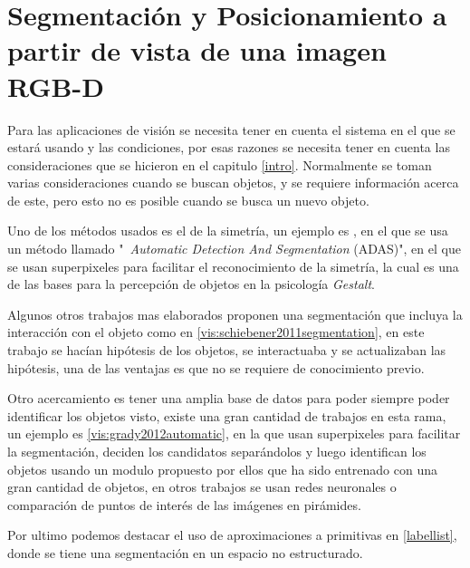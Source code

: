     \chapter{Segmentación y Posicionamiento a partir de vista de una imagen RGB-D}
    
    Para las aplicaciones de visión se necesita tener en cuenta el sistema en el que se estará usando y las condiciones, por esas razones se necesita tener en cuenta las consideraciones que se hicieron en el capitulo \ref{intro}. Normalmente se toman varias consideraciones cuando se buscan objetos, y se requiere información acerca de este, pero esto no es posible cuando se busca un nuevo objeto.
    
    Uno de los métodos usados es el de la simetría, un ejemplo es \cite{vis:kootstra2010fast}, en el que se usa un método llamado "\ \textit{Automatic Detection And Segmentation }(ADAS)", en el que se usan superpixeles para facilitar el reconocimiento de la simetría, la cual es una de las bases para la percepción de objetos en la psicología \textit{Gestalt}.
    
    Algunos otros trabajos mas elaborados proponen una segmentación que incluya la interacción con el objeto como en \cref{vis:schiebener2011segmentation}, en este trabajo se hacían hipótesis de los objetos, se interactuaba y se actualizaban las hipótesis, una de las ventajas es que no se requiere de conocimiento previo.
    
    Otro acercamiento es tener una amplia base de datos para poder siempre poder identificar los objetos visto, existe una gran cantidad de trabajos en esta rama, un ejemplo es \cref{vis:grady2012automatic}, en la que usan superpixeles para facilitar la segmentación, deciden los candidatos separándolos y luego identifican los objetos usando un modulo propuesto por ellos que ha sido entrenado con una gran cantidad de objetos, en otros trabajos se usan redes neuronales o comparación de puntos de interés de las imágenes en pirámides.
    
    Por ultimo podemos destacar el uso de aproximaciones a primitivas en \ref{labellist}, donde se tiene una segmentación en un espacio no estructurado.
    
    
